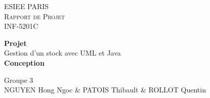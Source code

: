 \begin{titlepage}
\begin{center}

	\textsc{\LARGE ESIEE PARIS}\\
	\textsc{Rapport de Projet}\\
	\textsc{INF-5201C}\\[7cm]

	\begin{minipage}{0.8\textwidth}
		\begin{center}
		{ \huge \textbf{Projet} }\\[0.5cm]
		{ \huge Gestion d'un stock avec UML et Java}\\[0.5cm]
		{ \huge \textbf{Conception} }
		\end{center}
	\end{minipage}

	\vfill

	{\large Groupe 3 } \\
	{\large NGUYEN Hong Ngoc \& PATOIS Thibault \& ROLLOT Quentin}
\end{center}
\end{titlepage}